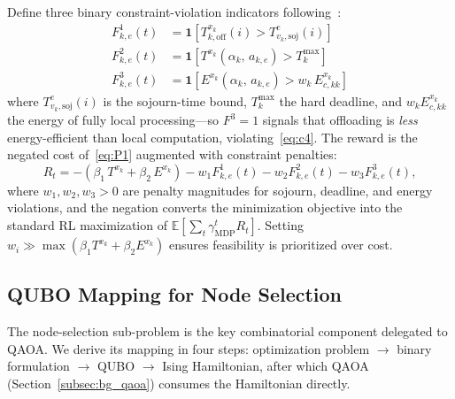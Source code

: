 \documentclass[11pt,a4paper]{article}
\theoremstyle{definition}
\begin{document}
Define three binary constraint-violation indicators following~\cite{hrl_ntn}:
\begin{align}
  F^1_{k,e}(t) &= \mathbf{1}\!\left[T_{k,\mathrm{off}}^{x_k}(i) > T_{v_k,\mathrm{soj}}^{e}(i)\right]
  \label{eq:f1} \\
  F^2_{k,e}(t) &= \mathbf{1}\!\left[T^{x_k}\!\left(\alpha_k,\,a_{k,e}\right) > T_k^{\max}\right]
  \label{eq:f2} \\
  F^3_{k,e}(t) &= \mathbf{1}\!\left[E^{x_k}\!\left(\alpha_k,\,a_{k,e}\right) > w_k\,E_{c,kk}^{x_k}\right]
  \label{eq:f3}
\end{align}
where $T_{v_k,\mathrm{soj}}^{e}(i)$ is the sojourn-time bound, $T_k^{\max}$ the hard deadline, and $w_k E_{c,kk}^{x_k}$ the energy of fully local processing---so $F^3=1$ signals that offloading is \emph{less} energy-efficient than local computation, violating~\eqref{eq:c4}. The reward is the negated cost of~\eqref{eq:P1} augmented with constraint penalties:
\begin{equation}
  R_t = -\!\left(\beta_1\,T^{x_k} + \beta_2\,E^{x_k}\right)
        - w_1 F^1_{k,e}(t)
        - w_2 F^2_{k,e}(t)
        - w_3 F^3_{k,e}(t),
  \label{eq:reward}
\end{equation}
where $w_1, w_2, w_3 > 0$ are penalty magnitudes for sojourn, deadline, and energy violations, and the negation converts the minimization objective into the standard RL maximization of $\mathbb{E}[\sum_t \gamma_{\mathrm{MDP}}^t R_t]$. Setting $w_i \gg \max(\beta_1 T^{x_k} + \beta_2 E^{x_k})$ ensures feasibility is prioritized over cost.

\subsection{QUBO Mapping for Node Selection}
\label{subsec:qubo}

The node-selection sub-problem is the key combinatorial component delegated to QAOA. We derive its mapping in four steps: optimization problem $\to$ binary formulation $\to$ QUBO $\to$ Ising Hamiltonian, after which QAOA (Section~\ref{subsec:bg_qaoa}) consumes the Hamiltonian directly.
\end{document}
